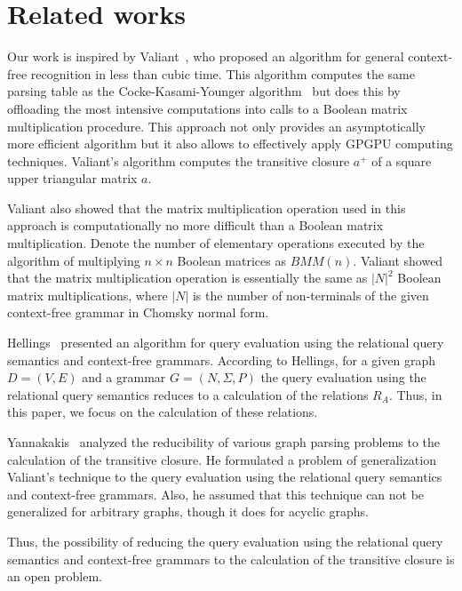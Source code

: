 \section{Related works} \label{section_related}
Our work is inspired by Valiant~\cite{valiant}, who proposed an algorithm for general context-free recognition in less than cubic time. This algorithm computes the same parsing table as the Cocke-Kasami-Younger algorithm~\cite{kasami, younger} but does this by offloading the most intensive computations into calls to a Boolean matrix multiplication procedure. This approach not only provides an asymptotically more efficient algorithm but it also allows to effectively apply GPGPU computing techniques. Valiant's algorithm computes the transitive closure $a^+$ of a square upper triangular matrix $a$.

Valiant also showed that the matrix multiplication operation used in this approach is computationally no more difficult than a Boolean matrix multiplication. Denote the number of elementary operations executed by the algorithm of multiplying $n \times n$ Boolean matrices as $BMM(n)$. Valiant showed that the matrix multiplication operation is essentially the same as $|N|^2$ Boolean matrix multiplications, where $|N|$ is the number of non-terminals of the given context-free grammar in Chomsky normal form.

Hellings~\cite{hellingsRelational} presented an algorithm for query evaluation using the relational query semantics and context-free grammars. According to Hellings, for a given graph $D = (V, E)$ and a grammar $G = (N, \Sigma, P)$ the query evaluation using the relational query semantics reduces to a calculation of the relations $R_A$. Thus, in this paper, we focus on the calculation of these relations.

Yannakakis~\cite{transitive-closure} analyzed the reducibility of various graph parsing problems to the calculation of the transitive closure. He formulated a problem of generalization Valiant's technique to the query evaluation using the relational query semantics and context-free grammars. Also, he assumed that this technique can not be generalized for arbitrary graphs, though it does for acyclic graphs.

Thus, the possibility of reducing the query evaluation using the relational query semantics and context-free grammars to the calculation of the transitive closure is an open problem.